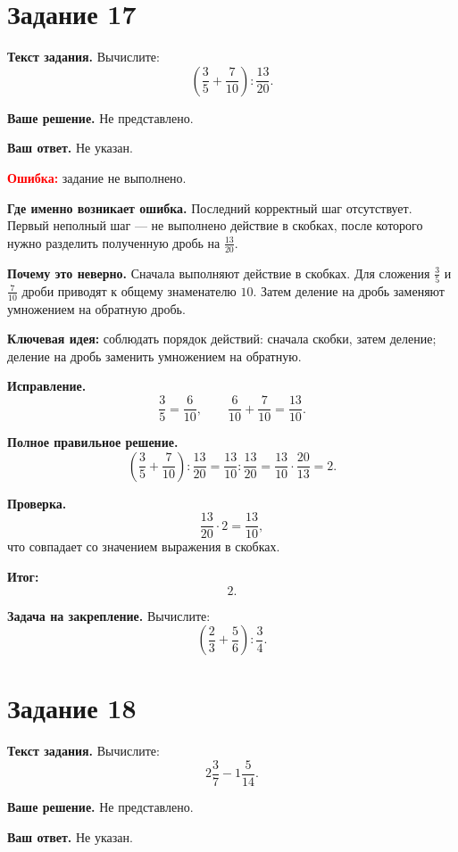 \documentclass[12pt,a4paper]{article}
\begin{document}
\section*{Задание 17}

\textbf{Текст задания.}
Вычислите:
\[
\left(\frac35+\frac7{10}\right):\frac{13}{20}.
\]

\textbf{Ваше решение.}
Не представлено.

\textbf{Ваш ответ.}
Не указан.

\textcolor{red}{\textbf{Ошибка:}} задание не выполнено.

\textbf{Где именно возникает ошибка.}
Последний корректный шаг отсутствует. Первый неполный шаг --- не выполнено действие в скобках, после которого нужно разделить полученную дробь на $\frac{13}{20}$.

\textbf{Почему это неверно.}
Сначала выполняют действие в скобках. Для сложения $\frac35$ и $\frac7{10}$ дроби приводят к общему знаменателю $10$. Затем деление на дробь заменяют умножением на обратную дробь.

\textcolor{blue!60!black}{\textbf{Ключевая идея:}} соблюдать порядок действий: сначала скобки, затем деление; деление на дробь заменить умножением на обратную.

\textbf{Исправление.}
\[
\frac35=\frac6{10},
\qquad
\frac6{10}+\frac7{10}=\frac{13}{10}.
\]

\textbf{Полное правильное решение.}
\[
\left(\frac35+\frac7{10}\right):\frac{13}{20}
=\frac{13}{10}:\frac{13}{20}
=\frac{13}{10}\cdot\frac{20}{13}
=2.
\]

\textbf{Проверка.}
\[
\frac{13}{20}\cdot2=\frac{13}{10},
\]
что совпадает со значением выражения в скобках.

\textcolor{teal!60!black}{\textbf{Итог:}}
\[
\boxed{2}.
\]

\textbf{Задача на закрепление.}
Вычислите:
\[
\left(\frac23+\frac56\right):\frac34.
\]

\newpage
{}\label{task:18}
\section*{Задание 18}

\textbf{Текст задания.}
Вычислите:
\[
2\frac37-1\frac5{14}.
\]

\textbf{Ваше решение.}
Не представлено.

\textbf{Ваш ответ.}
Не указан.
\end{document}

